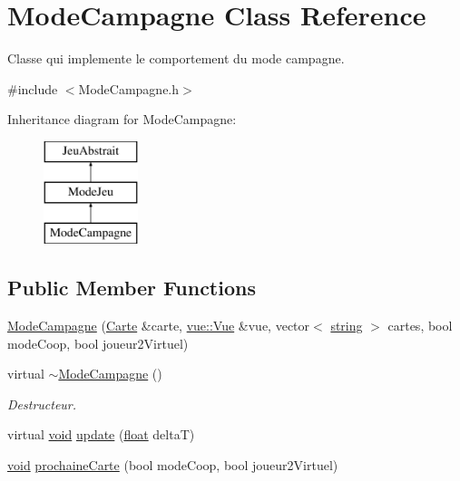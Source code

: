 \hypertarget{class_mode_campagne}{\section{Mode\-Campagne Class Reference}
\label{class_mode_campagne}
}


Classe qui implemente le comportement du mode campagne.  




{\ttfamily \#include $<$Mode\-Campagne.\-h$>$}

Inheritance diagram for Mode\-Campagne\-:\begin{figure}[H]
\begin{center}
\leavevmode
\includegraphics[height=3.000000cm]{class_mode_campagne}
\end{center}
\end{figure}
\subsection*{Public Member Functions}
\begin{DoxyCompactItemize}
\item 
\hyperlink{group__inf2990_gab7efcbe89e3c473537cf827aa7585855}{Mode\-Campagne} (\hyperlink{class_carte}{Carte} \&carte, \hyperlink{classvue_1_1_vue}{vue\-::\-Vue} \&vue, vector$<$ \hyperlink{glew_8h_ae84541b4f3d8e1ea24ec0f466a8c568b}{string} $>$ cartes, bool mode\-Coop, bool joueur2\-Virtuel)
\item 
virtual \hyperlink{group__inf2990_gad5c62416d036e67d8ce06fe9753e37fc}{$\sim$\-Mode\-Campagne} ()
\begin{DoxyCompactList}\small\item\em Destructeur. \end{DoxyCompactList}\item 
virtual \hyperlink{wglew_8h_aeea6e3dfae3acf232096f57d2d57f084}{void} \hyperlink{group__inf2990_ga5d794c1c233a859a92de85a2b60ba4fd}{update} (\hyperlink{fmod_8h_aeb841aa4b4b5f444b5d739d865b420af}{float} delta\-T)
\item 
\hyperlink{wglew_8h_aeea6e3dfae3acf232096f57d2d57f084}{void} \hyperlink{group__inf2990_ga0b02f51f6938b11d49af9a678e939174}{prochaine\-Carte} (bool mode\-Coop, bool joueur2\-Virtuel)
\end{DoxyCompactItemize}
